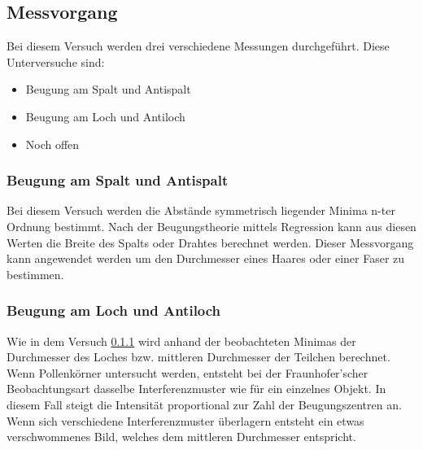 \subsection{Messvorgang}
Bei diesem Versuch werden drei verschiedene Messungen durchgeführt. Diese Unterversuche sind:
\begin{itemize}
	\item Beugung am Spalt und Antispalt
	\item Beugung am Loch und Antiloch
	\item Noch offen 
\end{itemize}

\subsubsection{Beugung am Spalt und Antispalt}\label{cap:Spalt}
Bei diesem Versuch werden die Abstände symmetrisch liegender Minima n-ter Ordnung bestimmt. Nach der Beugungstheorie mittels Regression kann aus diesen Werten die Breite des Spalts oder Drahtes berechnet werden. Dieser Messvorgang kann angewendet werden um den Durchmesser eines Haares oder einer Faser zu bestimmen.

\subsubsection{Beugung am Loch und Antiloch}
Wie in dem Versuch \ref{cap:Spalt} wird anhand der beobachteten Minimas der Durchmesser des Loches bzw. mittleren Durchmesser der Teilchen berechnet. Wenn Pollenkörner untersucht werden, entsteht bei der Fraunhofer'scher Beobachtungsart dasselbe Interferenzmuster wie für ein einzelnes Objekt. In diesem Fall steigt die Intensität proportional zur Zahl der Beugungszentren an. Wenn sich verschiedene Interferenzmuster überlagern entsteht ein etwas verschwommenes Bild, welches dem mittleren Durchmesser entspricht.

